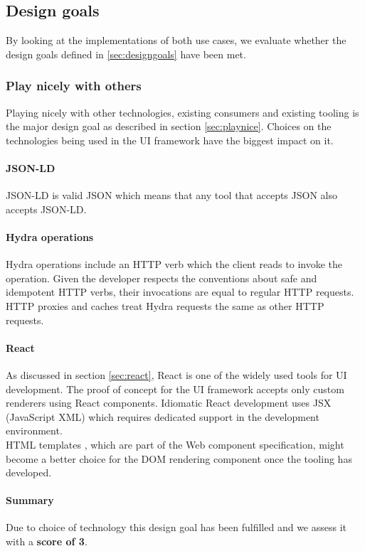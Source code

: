 \subsection{Design goals}
By looking at the implementations of both use cases, we evaluate whether the design goals defined in \ref{sec:designgoals} have been met.

\subsubsection{Play nicely with others}
Playing nicely with other technologies, existing consumers and existing tooling is the major design goal as described in section \ref{sec:playnice}. Choices on the technologies being used in the UI framework have the biggest impact on it.

\paragraph{JSON-LD}
JSON-LD is valid JSON which means that any tool that accepts JSON also accepts JSON-LD.

\paragraph{Hydra operations}
Hydra operations include an  HTTP verb which the client reads to invoke the operation. Given the developer respects the conventions about safe and idempotent HTTP verbs, their invocations are equal to regular HTTP requests. HTTP proxies and caches treat Hydra requests the same as other HTTP requests.

\paragraph{React}
As discussed in section \ref{sec:react}, React is one of the widely used tools for UI development. The proof of concept for the UI framework accepts only custom renderers using React components. Idiomatic React development uses JSX (JavaScript XML) which requires dedicated support in the development environment. \\
HTML templates \citep{htmltemplates}, which are part of the Web component specification, might become a better choice for the DOM rendering component once the tooling has developed.

\paragraph{Summary}
Due to choice of technology this design goal has been fulfilled and we assess it with a \textbf{score of 3}.

